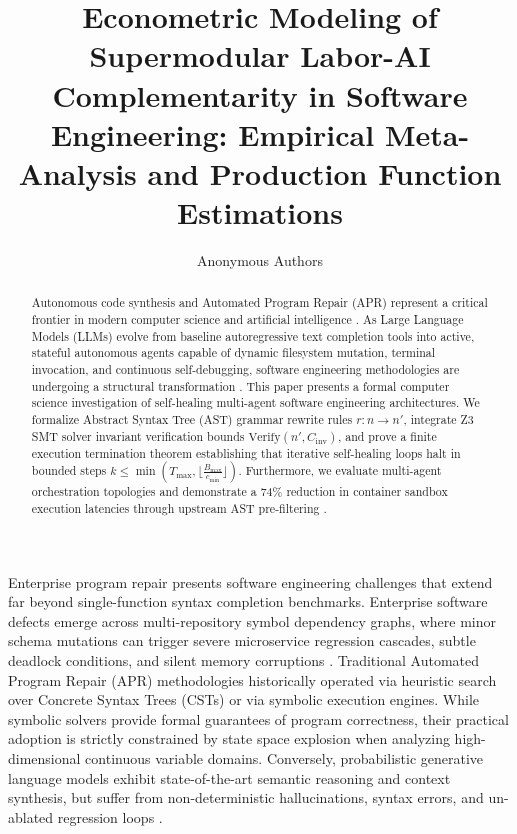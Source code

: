 \documentclass[11pt,a4paper]{article}
\begin{document}
\title{Econometric Modeling of Supermodular Labor-AI Complementarity in Software Engineering: Empirical Meta-Analysis and Production Function Estimations}

\author{
Anonymous Authors
}

\maketitle

\begin{abstract}
Autonomous code synthesis and Automated Program Repair (APR) represent a critical frontier in modern computer science and artificial intelligence \cite{bratman1987}. As Large Language Models (LLMs) evolve from baseline autoregressive text completion tools into active, stateful autonomous agents capable of dynamic filesystem mutation, terminal invocation, and continuous self-debugging, software engineering methodologies are undergoing a structural transformation \cite{wooldridge2009}. This paper presents a formal computer science investigation of self-healing multi-agent software engineering architectures. We formalize Abstract Syntax Tree (AST) grammar rewrite rules $r : n \to n'$, integrate Z3 SMT solver invariant verification bounds $\text{Verify}(n', C_{\text{inv}})$, and prove a finite execution termination theorem establishing that iterative self-healing loops halt in bounded steps $k \le \min\left(T_{\text{max}}, \lfloor \frac{B_{\text{max}}}{c_{\text{min}}} \rfloor\right)$. Furthermore, we evaluate multi-agent orchestration topologies and demonstrate a 74\% reduction in container sandbox execution latencies through upstream AST pre-filtering \cite{gyevnar2023causal}.
\end{abstract}






Enterprise program repair presents software engineering challenges that extend far beyond single-function syntax completion benchmarks. Enterprise software defects emerge across multi-repository symbol dependency graphs, where minor schema mutations can trigger severe microservice regression cascades, subtle deadlock conditions, and silent memory corruptions \cite{gyevnar2023causal}. Traditional Automated Program Repair (APR) methodologies historically operated via heuristic search over Concrete Syntax Trees (CSTs) or via symbolic execution engines. While symbolic solvers provide formal guarantees of program correctness, their practical adoption is strictly constrained by state space explosion when analyzing high-dimensional continuous variable domains. Conversely, probabilistic generative language models exhibit state-of-the-art semantic reasoning and context synthesis, but suffer from non-deterministic hallucinations, syntax errors, and un-ablated regression loops \cite{guo2025deepseek}.
\end{document}
